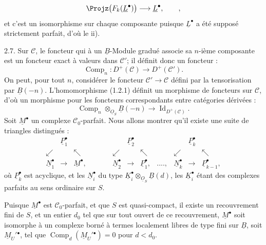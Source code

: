 
\[
  \Projz\bigl(F_k(\underline{L}^{\bullet})\bigr)\longrightarrow \underline{L}^{\bullet},\qquad ,
\]
et c'est un
isomorphisme sur chaque composante puisque $\underline{L}^{\bullet}$ a été supposé strictement parfait, d'où le ii).

2.7. Sur $\mathcal C$, le foncteur qui à un $\underline{B}$-Module gradué associe sa $n$-ième composante est un foncteur exact à valeurs dans $\mathcal C'$; il définit donc un foncteur :
\begin{equation}\tag{2.7.1}
  \operatorname{Comp}_n:D^+(\mathcal C)\longrightarrow D^+(\mathcal C').
\end{equation}
On peut, pour tout $n$, considérer le foncteur $\mathcal C'\to\mathcal C$ défini par la tensorisation par $\underline{B}(-n)$. L'homomorphisme (1.2.1) définit un morphisme de foncteurs sur $\mathcal C$, d'où un morphisme pour les foncteurs correspondants entre catégories dérivées :
\begin{equation}\tag{2.7.2}
  \operatorname{Comp}_n\otimes_{\underline{O}_S} \underline{B}(-n)
  \longrightarrow \operatorname{Id}_{D^+(\mathcal C)}.
\end{equation}
Soit $\underline{M}^{\bullet}$ un complexe $\mathcal C_0$-parfait. Nous allons montrer qu'il existe une suite de triangles distingués :
\[
\begin{array}{ccccccccccc}
& \underline{P}_1^{\bullet} &&&& \underline{P}_2^{\bullet} &&&& \underline{P}_k^{\bullet} & \\
\swarrow && \nwarrow && \swarrow && \nwarrow && \swarrow && \nwarrow \\
\underline{N}_1^{\bullet} & \longrightarrow & \underline{M}^{\bullet}, & \qquad &
\underline{N}_2^{\bullet} & \longrightarrow & \underline{P}_1^{\bullet}, & ...., &
\underline{N}_k^{\bullet} & \longrightarrow & \underline{P}_{k-1}^{\bullet},
\end{array}
\]
où $\underline{P}_k^{\bullet}$ est acyclique, et les $\underline{N}_i^{\bullet}$ du type \(\underline{K}_i^{\bullet}\otimes_{\underline{O}_S}\underline{B}(d)\), les $\underline{K}_i^{\bullet}$ étant des complexes parfaits au sens ordinaire sur $S$.

Puisque $\underline{M}^{\bullet}$ est $\mathcal C_0$-parfait, et que $S$ est quasi-compact, il existe un recouvrement fini de $S$, et un entier $d_0$ tel que sur tout ouvert de ce recouvrement, $\underline{M}^{\bullet}$ soit isomorphe à un complexe borné à termes localement libres de type fini sur $\underline{B}$, soit $\underline{M}_U'{}^{\bullet}$, tel que $\operatorname{Comp}_d(\underline{M}_U'{}^{\bullet})=0$ pour $d<d_0$.

